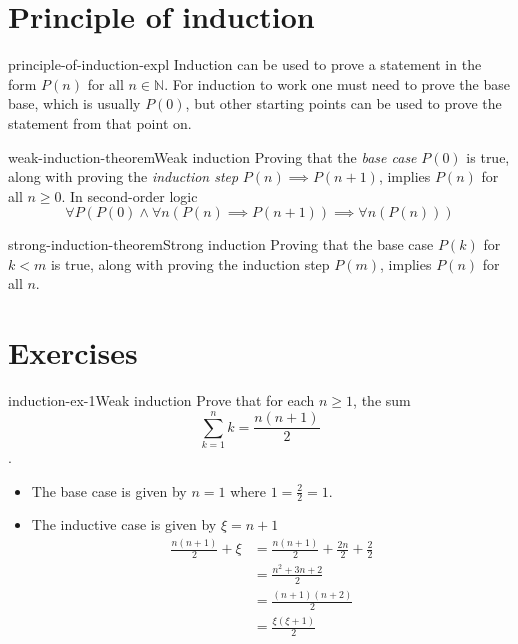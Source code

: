 \documentclass[preview]{standalone}
\begin{document}
\genpage

\section{Principle of induction}

\begin{snippet}{principle-of-induction-expl}
    Induction can be used to prove a statement in the form \(P(n)\)
    for all \(n \in \mathbb{N}\).
    For induction to work one must need to prove the base base, which is usually \(P(0)\),
    but other starting points can be used to prove the statement from that point on.
\end{snippet}

\begin{snippettheorem}{weak-induction-theorem}{Weak induction}
    Proving that the \textit{base case} \(P(0)\) is true,
    along with proving the \textit{induction step} \(P(n) \implies P(n+1)\), implies \(P(n)\)
    for all \(n \geq 0\). In second-order logic
    \[
        \forall P \left(
            P(0) \land \forall n \left( P(n) \implies P(n+1) \right)
            \implies \forall n \left( P(n) \right)
        \right)
    \]
\end{snippettheorem}

\begin{snippettheorem}{strong-induction-theorem}{Strong induction}
    Proving that the base case \(P(k)\) for \(k < m\) is true, along with
    proving the induction step \(P(m)\), implies \(P(n)\)
    for all \(n\).
\end{snippettheorem}


\section{Exercises}

\begin{snippetexercise}{induction-ex-1}{Weak induction}
    Prove that for each \(n \geq 1\), the sum \[ \sum_{k=1}^n k = \frac{n(n+1)}{2} \].
    \begin{itemize}
        \item The base case is given by \(n=1\) where \(1 = \frac{2}{2} = 1\).
        \item The inductive case is given by \(\xi = n+1\)
        \begin{align*}
            \frac{n(n+1)}{2} + \xi &= \frac{n(n+1)}{2} + \frac{2n}{2} + \frac{2}{2} \\
            &= \frac{n^2 + 3n + 2}{2} \\
            &= \frac{(n+1)(n+2)}{2} \\
            &= \frac{\xi(\xi+1)}{2}
        \end{align*}
    \end{itemize}
\end{snippetexercise}
\end{document}
